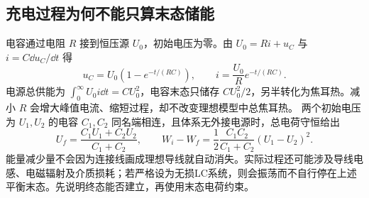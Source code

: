 \subsection{充电过程为何不能只算末态储能}
电容通过电阻 $R$ 接到恒压源 $U_0$，初始电压为零。由 $U_0=Ri+u_C$ 与 $i=C\dd u_C/\dd t$ 得
\[
 u_C=U_0(1-e^{-t/(RC)}),\qquad i=\frac{U_0}{R}e^{-t/(RC)}.
\]
电源总供能为 $\int_0^\infty U_0i\dd t=CU_0^2$，电容末态只储存 $CU_0^2/2$，另半转化为焦耳热。减小 $R$ 会增大峰值电流、缩短过程，却不改变理想模型中总焦耳热。
两个初始电压为 $U_1,U_2$ 的电容 $C_1,C_2$ 同名端相连，且体系无外接电源时，总电荷守恒给出
\[
 U_f=\frac{C_1U_1+C_2U_2}{C_1+C_2},\qquad
 W_i-W_f=\frac12\frac{C_1C_2}{C_1+C_2}(U_1-U_2)^2.
\]
能量减少量不会因为连接线画成理想导线就自动消失。实际过程还可能涉及导线电感、电磁辐射及介质损耗；若严格设为无损LC系统，则会振荡而不自行停在上述平衡末态。先说明终态能否建立，再使用末态电荷约束。

